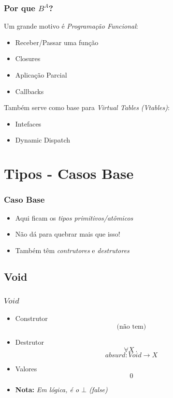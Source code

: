 \documentclass{beamer}
\newcommand{\nota}[1]{\textbf{Nota:}\textit{ #1}}
\renewcommand{\d}{\:.\:}
\begin{document}
\begin{frame}
    \frametitle{Por que \(B^A\)?}
    Um grande motivo é \emph{Programação Funcional}:
    \begin{itemize}
        \item Receber/Passar uma função
        \item Closures
        \item Aplicação Parcial
        \item Callbacks
    \end{itemize}
    \vfill
    \pause
    Também serve como base para
    \emph{Virtual Tables} \emph{(Vtables)}:
    \begin{itemize}
        \item Intefaces
        \item Dynamic Dispatch
    \end{itemize}
\end{frame}

\section{Tipos - Casos Base}
\begin{frame}
    \frametitle{Caso Base}
    \begin{itemize}
        \item Aqui ficam os \emph{tipos primitivos/atômicos}
            \vfill
        \item Não dá para quebrar mais que isso!
            \vfill
        \item Também têm \emph{contrutores} e \emph{destrutores}
    \end{itemize}
\end{frame}

\subsection{Void}
\begin{frame}
    \frametitle{\(Void\)}
      {
        \begin{itemize}
            \item Construtor
                \[
                    \text{(não tem)}
                \]
                \vfill
            \item Destrutor
                \[
                    \forall X \d
                \] \[
                    absurd : Void \to X
                \]
                \vfill
            \item Valores
                \[
                    0
                \]
                \vfill
            \item \nota{Em lógica, é o \(\bot\) \emph{(false)}}
        \end{itemize}
    }
\end{frame}
\end{document}
